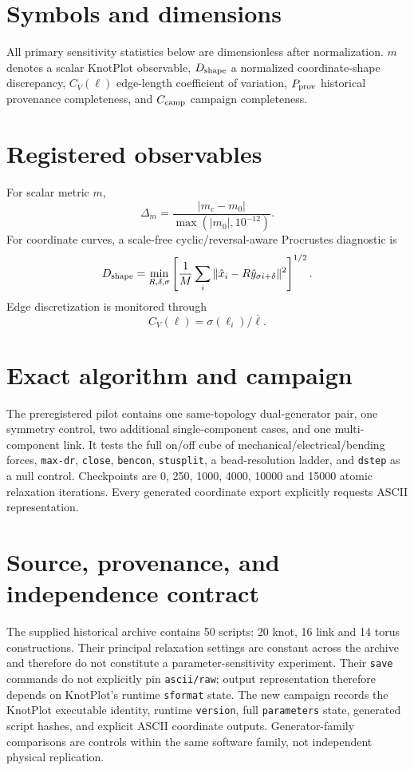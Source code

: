 \documentclass[11pt,a4paper]{article}
\newcommand{\code}[1]{\texttt{#1}}
\begin{document}
\section{Symbols and dimensions}
All primary sensitivity statistics below are dimensionless after normalization. $m$ denotes a scalar KnotPlot observable, $D_{\rm shape}$ a normalized coordinate-shape discrepancy, $C_V(\ell)$ edge-length coefficient of variation, $P_{\rm prov}$ historical provenance completeness, and $C_{\rm camp}$ campaign completeness.
\section{Registered observables}
For scalar metric $m$,
\begin{equation}\Delta_m=\frac{|m_c-m_0|}{\max(|m_0|,10^{-12})}.\end{equation}
For coordinate curves, a scale-free cyclic/reversal-aware Procrustes diagnostic is
\begin{equation}
D_{\rm shape}=\min_{R,\delta,\sigma}\left[\frac1M\sum_i\|\hat x_i-R\hat y_{\sigma i+\delta}\|^2\right]^{1/2}.
\end{equation}
Edge discretization is monitored through
\begin{equation}C_V(\ell)=\sigma(\ell_i)/\bar\ell.\end{equation}
\section{Exact algorithm and campaign}
The preregistered pilot contains one same-topology dual-generator pair, one symmetry control, two additional single-component cases, and one multi-component link. It tests the full on/off cube of mechanical/electrical/bending forces, \code{max-dr}, \code{close}, \code{bencon}, \code{stusplit}, a bead-resolution ladder, and \code{dstep} as a null control. Checkpoints are 0, 250, 1000, 4000, 10000 and 15000 atomic relaxation iterations. Every generated coordinate export explicitly requests ASCII representation.
\section{Source, provenance, and independence contract}
The supplied historical archive contains 50 scripts: 20 knot, 16 link and 14 torus constructions. Their principal relaxation settings are constant across the archive and therefore do not constitute a parameter-sensitivity experiment. Their \code{save} commands do not explicitly pin \code{ascii/raw}; output representation therefore depends on KnotPlot's runtime \code{sformat} state. The new campaign records the KnotPlot executable identity, runtime \code{version}, full \code{parameters} state, generated script hashes, and explicit ASCII coordinate outputs. Generator-family comparisons are controls within the same software family, not independent physical replication.
\end{document}
